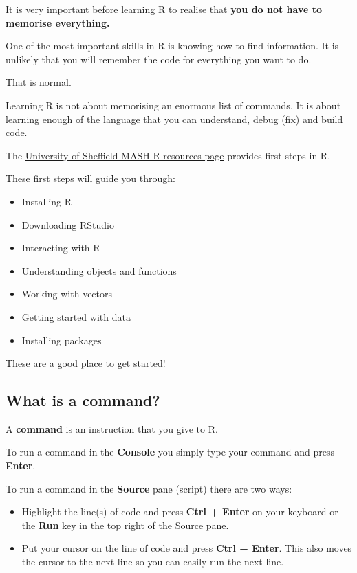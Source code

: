 \documentclass[
]{book}
\providecommand{\tightlist}{%
  \setlength{\itemsep}{0pt}\setlength{\parskip}{0pt}}
\begin{document}
It is very important before learning R to realise that \textbf{you do not have to memorise everything.}

One of the most important skills in R is knowing how to find information. It is unlikely that you will remember the code for everything you want to do.

That is normal.

Learning R is not about memorising an enormous list of commands. It is about learning enough of the language that you can understand, debug (fix) and build code.

The \href{https://sheffield.ac.uk/mash/stats-resources/r\#First-steps}{University of Sheffield MASH R resources page} provides first steps in R.

These first steps will guide you through:

\begin{itemize}
\tightlist
\item
  Installing R
\item
  Downloading RStudio
\item
  Interacting with R
\item
  Understanding objects and functions
\item
  Working with vectors
\item
  Getting started with data
\item
  Installing packages
\end{itemize}

These are a good place to get started!

\subsection{What is a command?}\label{what-is-a-command}

A \textbf{command} is an instruction that you give to R.

To run a command in the \textbf{Console} you simply type your command and press \textbf{Enter}.

To run a command in the \textbf{Source} pane (script) there are two ways:

\begin{itemize}
\item
  Highlight the line(s) of code and press \textbf{Ctrl + Enter} on your keyboard or the \textbf{Run} key in the top right of the Source pane.
\item
  Put your cursor on the line of code and press \textbf{Ctrl + Enter}. This also moves the cursor to the next line so you can easily run the next line.
\end{itemize}
\end{document}
